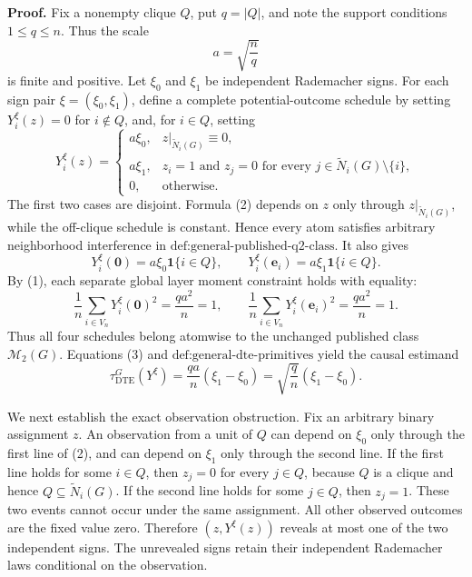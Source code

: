 \textbf{Proof.}
Fix a nonempty clique \(Q\), put \(q=|Q|\), and note the support conditions \(1\leq q\leq n\).  Thus the scale
\[
a=\sqrt{\frac{n}{q}}
\tag{1}
\]
is finite and positive.  Let \(\xi_0\) and \(\xi_1\) be independent Rademacher signs.  For each sign pair \(\xi=(\xi_0,\xi_1)\), define a complete potential-outcome schedule by setting \(Y_i^{\xi}(z)=0\) for \(i\notin Q\), and, for \(i\in Q\), setting
\[
Y_i^{\xi}(z)=
\begin{cases}
a\xi_0,
&z|_{\widetilde N_i(G)}\equiv0,\\
a\xi_1,
&z_i=1\text{ and }z_j=0\text{ for every }j\in\widetilde N_i(G)\setminus\{i\},\\
0,&\text{otherwise}.
\end{cases}
\tag{2}
\]
The first two cases are disjoint.  Formula (2) depends on \(z\) only through \(z|_{\widetilde N_i(G)}\), while the off-clique schedule is constant.  Hence every atom satisfies arbitrary neighborhood interference in \(\text{def:general-published-q2-class}\).  It also gives
\[
Y_i^{\xi}(\mathbf0)=a\xi_0\mathbf1\{i\in Q\},
\qquad
Y_i^{\xi}(\mathbf e_i)=a\xi_1\mathbf1\{i\in Q\}.
\tag{3}
\]
By (1), each separate global layer moment constraint holds with equality:
\[
\frac1n\sum_{i\in V_n}Y_i^{\xi}(\mathbf0)^2
=\frac{qa^2}{n}=1,
\qquad
\frac1n\sum_{i\in V_n}Y_i^{\xi}(\mathbf e_i)^2
=\frac{qa^2}{n}=1.
\tag{4}
\]
Thus all four schedules belong atomwise to the unchanged published class \(\mathcal M_2(G)\).  Equations (3) and \(\text{def:general-dte-primitives}\) yield the causal estimand
\[
\tau_{\mathrm{DTE}}^G(Y^{\xi})
=\frac{qa}{n}(\xi_1-\xi_0)
=\sqrt{\frac qn}(\xi_1-\xi_0).
\tag{5}
\]

We next establish the exact observation obstruction.  Fix an arbitrary binary assignment \(z\).  An observation from a unit of \(Q\) can depend on \(\xi_0\) only through the first line of (2), and can depend on \(\xi_1\) only through the second line.  If the first line holds for some \(i\in Q\), then \(z_j=0\) for every \(j\in Q\), because \(Q\) is a clique and hence \(Q\subseteq\widetilde N_i(G)\).  If the second line holds for some \(j\in Q\), then \(z_j=1\).  These two events cannot occur under the same assignment.  All other observed outcomes are the fixed value zero.  Therefore \((z,Y^{\xi}(z))\) reveals at most one of the two independent signs.  The unrevealed signs retain their independent Rademacher laws conditional on the observation.

